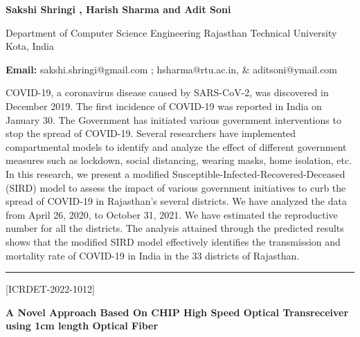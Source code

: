 \documentclass[twoside,11pt]{amsart}
\begin{document}
\centerline{\textbf{ Sakshi Shringi , Harish Sharma and Adit Soni}}
\vskip 5mm
\begin{flushleft}
Department of Computer Science Engineering
Rajasthan Technical University
Kota, India

\vskip 5mm
\end{flushleft}
\vskip 2mm
\begin{flushleft}
{\bf Email:} sakshi.shringi@gmail.com ; hsharma@rtu.ac.in,  \& aditsoni@ymail.com
\end{flushleft}
\vskip 10mm
COVID-19, a coronavirus disease caused by SARS-CoV-2, was discovered in December 2019. The first incidence of COVID-19 was reported in India on January 30. The Government has initiated various government interventions to stop the spread of COVID-19. Several researchers have implemented compartmental models to identify and analyze the effect of different government measures such as lockdown, social distancing, wearing masks, home isolation, etc. In this research, we present a modified Susceptible-Infected-Recovered-Deceased (SIRD) model to assess the impact of various government initiatives to curb the spread of COVID-19 in Rajasthan's several districts. We have analyzed the data from April 26, 2020, to October 31, 2021. We have estimated the reproductive number for all the districts. The analysis attained through the predicted results shows that the modified SIRD model effectively identifies the transmission and mortality rate of COVID-19 in India in the 33 districts of Rajasthan.
\vskip 5mm
\rule{\textwidth}{0.5pt}
\vskip 10mm
\begin{flushleft}
\centerline{[ICRDET-2022-1012]}
\end{flushleft}
\begin{center}\bf\LARGE
A Novel Approach Based On CHIP High Speed Optical Transreceiver using 1cm length Optical Fiber
\end{center}
\vskip 5mm
\end{document}
